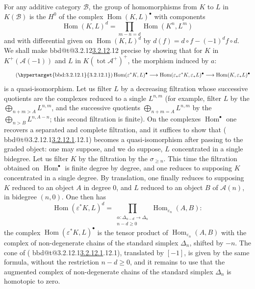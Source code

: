 \documentclass[12pt,oneside]{amsbook}
\makeatletter
\newcommand{\bbdreg}[1]{\expandafter\gdef\csname bbd@t@#1\endcsname{1}}
\newcommand{\bbdrecord}[1]{%
  \if@filesw\immediate\write\@auxout{\string\bbdreg{#1}}\fi}
\DeclareRobustCommand{\anch}[1]{\hypertarget{bbd:#1}{#1}\bbdrecord{#1}}
\DeclareRobustCommand{\rn}[1]{%
  \ifcsname bbd@t@#1\endcsname\hyperlink{bbd:#1}{#1}\else#1\fi}
\newcommand{\eqtag}[1]{\stepcounter{equation}\tag{\anch{#1}}}
\theoremstyle{plain}
\theoremstyle{definition}
\newcommand{\cA}{\mathcal{A}}   \newcommand{\cB}{\mathcal{B}}
\DeclareMathOperator{\Hom}{Hom}
\DeclareMathOperator{\tot}{tot}
\makeatother
\begin{document}
For any additive category $\cB$, the group of homomorphisms from $K$ to $L$ in $K(\cB)$ is the $H^0$ of the complex $\Hom(K,L)^{\bullet}$ with components
\[
\Hom(K,L)^d = \prod_{m-n=d} \Hom(K^n,L^m)
\]
and with differential given on $\Hom(K,L)^d$ by $d(f) = d\circ f - (-1)^d f\circ d$. We shall make \rn{3.2.12} precise by showing that for $K$ in $K^{+}(\cA(-1))$ and $L$ in $K(\tot\cA^{+})^{+}$, the morphism induced by $a$:
\begin{equation}
\eqtag{3.2.12.1}
\Hom(\varepsilon^{*}K,L)^{\bullet} \longrightarrow
\Hom(\varepsilon_{*}\varepsilon^{*}K,\varepsilon_{*}L)^{\bullet} \longrightarrow
\Hom(K,\varepsilon_{*}L)^{\bullet}
\end{equation}
is a quasi-isomorphism. Let us filter $L$ by a decreasing filtration whose successive quotients are the complexes reduced to a single $L^{n,m}$ (for example, filter $L$ by the $\bigoplus_{n+m>A}L^{n,m}$, and the successive quotients $\bigoplus_{n+m=A}L^{n,m}$ by the $\bigoplus_{n>B}L^{n,A-n}$; this second filtration is finite). On the complexes $\Hom^{\bullet}$ one recovers a separated and complete filtration, and it suffices to show that (\rn{3.2.12.1}) becomes a quasi-isomorphism after passing to the graded object: one may suppose, and we do suppose, $L$ concentrated in a single bidegree. Let us filter $K$ by the filtration by the $\sigma_{\ge n}$. This time the filtration obtained on $\Hom^{\bullet}$ is finite degree by degree, and one reduces to supposing $K$ concentrated in a single degree. By translation, one finally reduces to supposing $K$ reduced to an object $A$ in degree $0$, and $L$ reduced to an object $B$ of $\cA(n)$, in bidegree $(n,0)$. One then has
\[
\Hom(\varepsilon^{*}K,L)^d = \prod_{\substack{\alpha : \Delta_{n-d}\to\Delta_n\\ n-d \ge 0}}
\Hom_{\varepsilon_n}(A,B) :
\]
the complex $\Hom(\varepsilon^{*}K,L)^{\bullet}$ is the tensor product of $\Hom_{\varepsilon_n}(A,B)$ with the complex of non-degenerate chains of the standard simplex $\Delta_n$, shifted by $-n$. The cone of (\rn{3.2.12.1}), translated by $[-1]$, is given by the same formula, without the restriction $n-d \ge 0$, and it remains to use that the augmented complex of non-degenerate chains of the standard simplex $\Delta_n$ is homotopic to zero.
\end{document}
